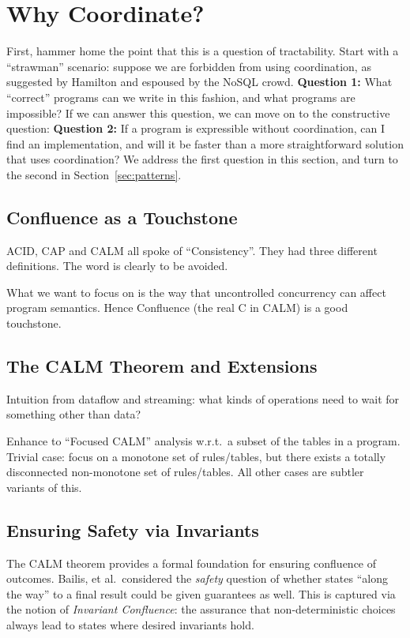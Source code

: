 \documentclass{sig-alternate}
\begin{document}
\section{Why Coordinate?}
First, hammer home the point that this is a question of tractability.  Start with a ``strawman'' scenario: suppose we are forbidden from using coordination, as suggested by Hamilton and espoused by the NoSQL crowd.  \textbf{Question 1:} What ``correct'' programs can we write in this fashion, and what programs are impossible?  If we can answer this question, we can move on to the constructive question:  \textbf{Question 2:} If a program is expressible without coordination, can I find an implementation, and will it be faster than a more straightforward solution that uses coordination?  We address the first question in this section, and turn to the second in Section~\ref{sec:patterns}.

\subsection{Confluence as a Touchstone}
ACID, CAP and CALM all spoke of ``Consistency''.  They had three different definitions.  The word is clearly to be avoided.

What we want to focus on is the way that uncontrolled concurrency can affect program semantics.  Hence Confluence (the real C in CALM) is a good touchstone.

\subsection{The CALM Theorem and Extensions}
Intuition from dataflow and streaming: what kinds of operations need to wait for something other than data?  

Enhance to ``Focused CALM'' analysis w.r.t.\ a subset of the tables in a program.  Trivial case: focus on a monotone set of rules/tables, but there exists a totally disconnected non-monotone set of rules/tables.  All other cases are subtler variants of this.

\subsection{Ensuring Safety via Invariants}
The CALM theorem provides a formal foundation for ensuring confluence of outcomes.  Bailis, et al.~considered the \emph{safety} question of whether states ``along the way'' to a final result could be given guarantees as well.  This is captured via the notion of \emph{Invariant Confluence}: the assurance that non-deterministic choices always lead to states where desired invariants hold.
\end{document}
